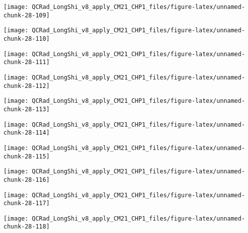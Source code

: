 \documentclass[
  10pt,
  a4paper,oneside]{article}
\begin{document}
\begin{center}\texttt{[image: QCRad\_LongShi\_v8\_apply\_CM21\_CHP1\_files/figure-latex/unnamed-chunk-28-109]} \end{center}

\begin{center}\texttt{[image: QCRad\_LongShi\_v8\_apply\_CM21\_CHP1\_files/figure-latex/unnamed-chunk-28-110]} \end{center}

\begin{center}\texttt{[image: QCRad\_LongShi\_v8\_apply\_CM21\_CHP1\_files/figure-latex/unnamed-chunk-28-111]} \end{center}

\begin{center}\texttt{[image: QCRad\_LongShi\_v8\_apply\_CM21\_CHP1\_files/figure-latex/unnamed-chunk-28-112]} \end{center}

\begin{center}\texttt{[image: QCRad\_LongShi\_v8\_apply\_CM21\_CHP1\_files/figure-latex/unnamed-chunk-28-113]} \end{center}

\begin{center}\texttt{[image: QCRad\_LongShi\_v8\_apply\_CM21\_CHP1\_files/figure-latex/unnamed-chunk-28-114]} \end{center}

\begin{center}\texttt{[image: QCRad\_LongShi\_v8\_apply\_CM21\_CHP1\_files/figure-latex/unnamed-chunk-28-115]} \end{center}

\begin{center}\texttt{[image: QCRad\_LongShi\_v8\_apply\_CM21\_CHP1\_files/figure-latex/unnamed-chunk-28-116]} \end{center}

\begin{center}\texttt{[image: QCRad\_LongShi\_v8\_apply\_CM21\_CHP1\_files/figure-latex/unnamed-chunk-28-117]} \end{center}

\begin{center}\texttt{[image: QCRad\_LongShi\_v8\_apply\_CM21\_CHP1\_files/figure-latex/unnamed-chunk-28-118]} \end{center}
\end{document}
